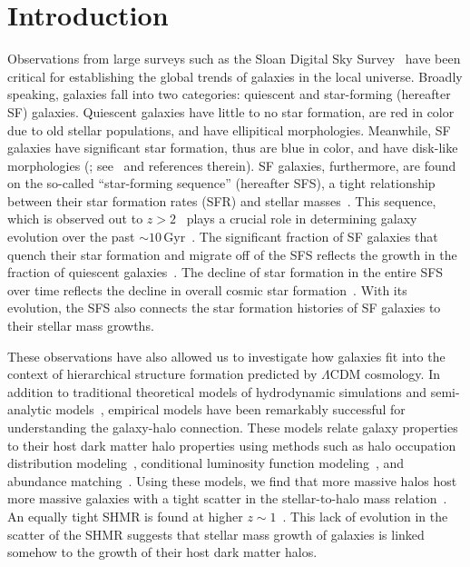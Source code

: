 \documentclass[12pt, letterpaper, preprint, tighten]{aastex62}
\newcommand{\edt}[1]{{\color{dred}{\bf} #1}}
\begin{document}
\section{Introduction}
Observations from large surveys such as the Sloan Digital Sky Survey~\citep[SDSS;][]{york2000}
have been critical for establishing the global trends of galaxies in
the local universe. Broadly speaking, galaxies fall into two categories:
quiescent and star-forming (hereafter SF) galaxies. Quiescent galaxies
have little to no star formation, are red in color
\edt{due to old stellar populations},
and have ellipitical
morphologies. Meanwhile, SF galaxies have significant star formation,
\edt{thus}
are blue in color, and have disk-like morphologies (\citealt{kauffmann2003, blanton2003, baldry2006, taylor2009, moustakas2013};
see~\citealt{blanton2009} and references therein).
SF galaxies, furthermore, are found on the so-called ``star-forming sequence''
(hereafter SFS), a tight relationship between their star formation rates (SFR)
and stellar masses~\citep[][see also Figure~\ref{fig:groupcat}]{noeske2007, daddi2007, salim2007, speagle2014, lee2015}.
This sequence, which is observed out to $z > 2$~\citep{wang2013, leja2015}
plays a crucial role in
\edt{determining}
galaxy evolution over the past ${\sim}10\,\mathrm{Gyr}$~\citep[see][for an alternative point of view]{kelson2014,abramson2016}.
The significant fraction of SF galaxies that quench their
star formation and migrate off of the SFS reflects the growth in the
fraction of quiescent galaxies~\citep{blanton2006, borch2006, bundy2006, moustakas2013}.
The decline of star formation in the entire SFS~\citep{lee2015, schreiber2015}
over time reflects the decline in overall cosmic star formation~\citep{hopkins2006, behroozi2013, madau2014}.
With its evolution, the SFS also connects the star formation histories of SF
galaxies to their stellar mass growths.

These observations have also allowed us to investigate how galaxies fit
into the context of hierarchical structure formation predicted by 
$\Lambda$CDM cosmology. In addition to traditional theoretical
models of hydrodynamic simulations and semi-analytic
models~\citep[see][for reviews]{silk2012, somerville2015},
empirical models \edt{have} been remarkably successful for understanding 
the galaxy-halo connection. These models relate galaxy
properties to their host dark matter halo properties using methods such as
halo occupation distribution modeling~\citep[HOD; \emph{e.g.}][]{zheng2007,zehavi2011,leauthaud2012,parejko2013,zu2015},
\edt{conditional} luminosity function modeling~\citep[\emph{e.g.}][]{yang2009}, and abundance
matching~\citep[\emph{e.g.}][]{kravtsov2004, vale2006, conroy2009, moster2013, reddick2013}.
Using these models, we find that more massive halos host more
massive galaxies with a tight scatter in the stellar-to-halo
mass relation~\citep[hereafter SHMR;][]{mandelbaum2006a, conroy2007, more2011, leauthaud2012, tinker2013, velander2014, han2015, zu2015, gu2016, lange2018a}. An equally tight SHMR is found at higher
$z\sim1$~\citep{leauthaud2012, tinker2013, patel2015}. This lack of
evolution in the scatter of the SHMR suggests that stellar
mass growth of galaxies is linked somehow to the growth
of their host dark matter halos.
\end{document}

